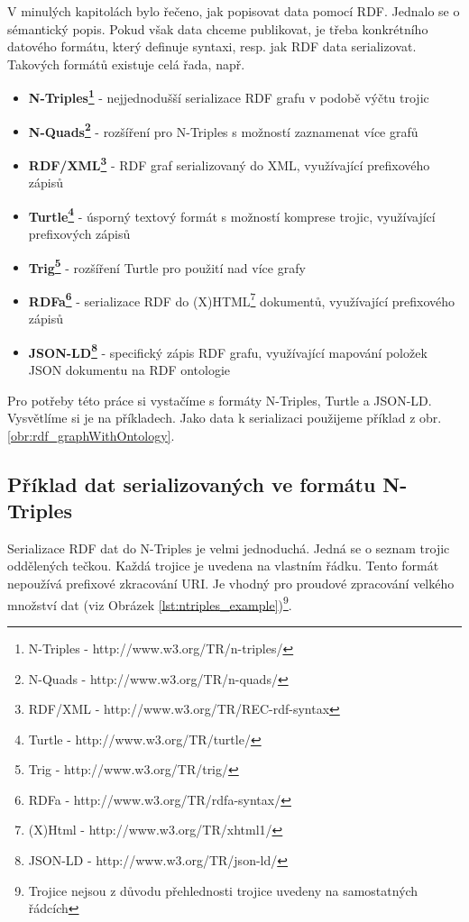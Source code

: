 V minulých kapitolách bylo řečeno, jak popisovat data pomocí RDF. Jednalo se o sémantický popis. Pokud však data chceme publikovat, je třeba konkrétního datového formátu, který definuje syntaxi, resp. jak RDF data serializovat. Takových formátů existuje celá řada, např.

\begin{itemize}
\item \textbf{N-Triples\footnote{N-Triples - http://www.w3.org/TR/n-triples/}} - nejjednodušší serializace RDF grafu v podobě výčtu trojic
\item \textbf{N-Quads\footnote{N-Quads - http://www.w3.org/TR/n-quads/}} - rozšíření pro N-Triples s možností zaznamenat více grafů
\item \textbf{RDF/XML\footnote{RDF/XML - http://www.w3.org/TR/REC-rdf-syntax}} - RDF graf serializovaný do XML, využívající prefixového zápisů
\item \textbf{Turtle\footnote{Turtle - http://www.w3.org/TR/turtle/}} - úsporný textový formát s možností komprese trojic, využívající prefixových zápisů
\item \textbf{Trig\footnote{Trig - http://www.w3.org/TR/trig/}} - rozšíření Turtle pro použití nad více grafy
\item \textbf{RDFa\footnote{RDFa - http://www.w3.org/TR/rdfa-syntax/}} - serializace RDF do (X)HTML\footnote{(X)Html - http://www.w3.org/TR/xhtml1/} dokumentů, využívající prefixového zápisů
\item \textbf{JSON-LD\footnote{JSON-LD - http://www.w3.org/TR/json-ld/
}} - specifický zápis RDF grafu, využívající mapování položek JSON dokumentu na RDF ontologie
\end{itemize}

Pro potřeby této práce si vystačíme s formáty N-Triples, Turtle a JSON-LD. Vysvětlíme si je na příkladech. Jako data k serializaci použijeme příklad z obr. \ref{obr:rdf_graphWithOntology}.

\subsection{Příklad dat serializovaných ve formátu N-Triples}

Serializace RDF dat do N-Triples je velmi jednoduchá. Jedná se o seznam trojic oddělených tečkou. Každá trojice je uvedena na vlastním řádku. Tento formát nepoužívá prefixové zkracování URI. Je vhodný pro proudové zpracování velkého množství dat (viz Obrázek \ref{lst:ntriples_example})\footnote{Trojice nejsou z důvodu přehlednosti trojice uvedeny na samostatných řádcích}.\\


